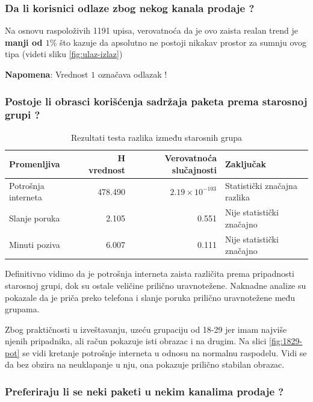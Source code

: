\documentclass[a4paper,12pt]{article}
\begin{document}
    \subsubsection*{Da li korisnici odlaze zbog nekog kanala prodaje ?}
    Na osnovu raspoloživih 1191 upisa, verovatnoća da je ovo zaista realan trend je \textbf{manji od $1\%$} što kazuje da apsolutno ne postoji
nikakav prostor za sumnju ovog tipa (videti sliku \ref{fig:ulaz-izlaz})

    \textbf{Napomena}: Vrednost $1$ označava odlazak !

    \subsubsection*{Postoje li obrasci korišćenja sadržaja paketa prema starosnoj grupi ?}

    \begin{table}[htbp]
    \centering
    \caption{Rezultati testa razlika između starosnih grupa}
    \label{tab:kruskal-starosne-grupe}
    \small
    \begin{tabular}{lrrl}
    \toprule
    \textbf{Promenljiva} & \textbf{H vrednost} & \textbf{Verovatnoća slučajnosti} & \textbf{Zaključak} \\
    \midrule
    Potrošnja interneta & 478.490 & $2.19 \times 10^{-103}$ & Statistički značajna razlika \\
    Slanje poruka & 2.105 & 0.551 & Nije statistički značajno \\
    Minuti poziva & 6.007 & 0.111 & Nije statistički značajno \\
    \bottomrule
    \end{tabular}
    \end{table}


    Definitivno vidimo da je potrošnja interneta zaista različita prema pripadnosti starosnoj grupi, dok su ostale veličine
prilično uravnotežene. Naknadne analize su pokazale da je priča preko telefona i slanje poruka prilično uravnotežene među
grupama.

    Zbog praktičnosti u izveštavanju, uzeću grupaciju od 18-29 jer imam najviše njenih pripadnika, ali račun pokazuje
isti obrazac i na drugim. Na slici \ref{fig:1829-pot} se vidi kretanje potrošnje interneta u odnosu na normalnu raspodelu. Vidi se da bez obzira
na neuklapanje u nju, ona pokazuje prilično stabilan obrazac.

    \subsubsection*{Preferiraju li se neki paketi u nekim kanalima prodaje ?}
\end{document}
